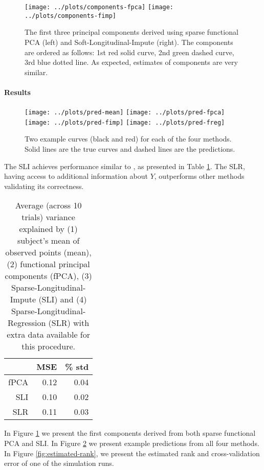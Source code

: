 \documentclass[preprint]{imsart}
\numberwithin{equation}{section}
\theoremstyle{plain}
\begin{document}
 \begin{figure}[h!]
  \texttt{[image: ../plots/components-fpca]}
  \texttt{[image: ../plots/components-fimp]}
  \caption{The first three principal components derived using sparse functional PCA (left) and Soft-Longitudinal-Impute (right). The components are ordered as follows: 1st red solid curve, 2nd green dashed curve, 3rd blue dotted line. As expected, estimates of components are very similar.}
  \label{fig:principal-components}
\end{figure}

\paragraph{Results}

\begin{figure}[h!]
  \texttt{[image: ../plots/pred-mean]}
  \texttt{[image: ../plots/pred-fpca]}
  \texttt{[image: ../plots/pred-fimp]}
  \texttt{[image: ../plots/pred-freg]}
  \caption{Two example curves (black and red) for each of the four methods. Solid lines are the true curves and dashed lines are the predictions. }
  \label{fig:example-predictions}
\end{figure}

The SLI achieves performance similar to \citep{james2000principal}, as presented in Table \ref{tbl:simulations}. The SLR, having access to additional information about $Y$, outperforms other methods validating its correctness.

\begin{table}[ht]
\centering
\begin{tabular}{rrr}
  \hline
 & MSE & \% std \\ 
  \hline
  fPCA & 0.12 & 0.04 \\ 
  SLI & 0.10 & 0.02 \\ 
  SLR & 0.11 & 0.03 \\ 
   \hline
\end{tabular}\label{tbl:simulations}
\caption{Average (across 10 trials) variance explained by (1) subject's mean of observed points (mean), (2) functional principal components (fPCA), (3) Sparse-Longitudinal-Impute (SLI) and (4) Sparse-Longitudinal-Regression (SLR) with extra data available for this procedure.}
\end{table}

In Figure \ref{fig:principal-components} we present the first components derived from both sparse functional PCA and SLI. In Figure \ref{fig:example-predictions} we present example predictions from all four methods. In Figure \ref{fig:estimated-rank}, we present the estimated rank and cross-validation error of one of the simulation runs.
\end{document}
